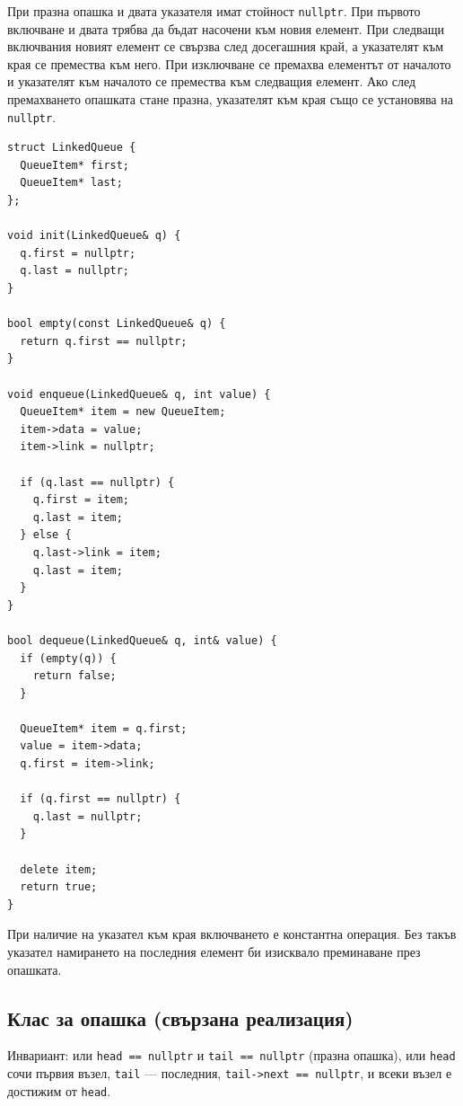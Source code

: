 При празна опашка и двата указателя имат стойност \verb|nullptr|. При първото включване и двата трябва да бъдат насочени към новия елемент. При следващи включвания новият елемент се свързва след досегашния край, а указателят към края се премества към него. При изключване се премахва елементът от началото и указателят към началото се премества към следващия елемент. Ако след премахването опашката стане празна, указателят към края също се установява на \verb|nullptr|.

\begin{verbatim}
struct LinkedQueue {
  QueueItem* first;
  QueueItem* last;
};

void init(LinkedQueue& q) {
  q.first = nullptr;
  q.last = nullptr;
}

bool empty(const LinkedQueue& q) {
  return q.first == nullptr;
}

void enqueue(LinkedQueue& q, int value) {
  QueueItem* item = new QueueItem;
  item->data = value;
  item->link = nullptr;

  if (q.last == nullptr) {
    q.first = item;
    q.last = item;
  } else {
    q.last->link = item;
    q.last = item;
  }
}

bool dequeue(LinkedQueue& q, int& value) {
  if (empty(q)) {
    return false;
  }

  QueueItem* item = q.first;
  value = item->data;
  q.first = item->link;

  if (q.first == nullptr) {
    q.last = nullptr;
  }

  delete item;
  return true;
}
\end{verbatim}

При наличие на указател към края включването е константна операция. Без такъв указател намирането на последния елемент би изисквало преминаване през опашката.


\subsection{Клас за опашка (свързана реализация)}\label{s:18.4.3}

Инвариант: или \verb|head == nullptr| и \verb|tail == nullptr| (празна опашка),
или \verb|head| сочи първия възел, \verb|tail| --- последния,
\verb|tail->next == nullptr|, и всеки възел е достижим от \verb|head|.


